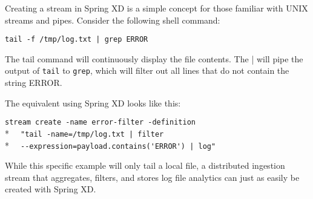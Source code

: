 Creating a stream in Spring XD is a simple concept for those familiar with
UNIX streams and pipes. Consider the following shell command:

\verb;tail -f /tmp/log.txt | grep ERROR;

The tail command will continuously display the file contents. The |
will pipe the output of \texttt{tail} to \texttt{grep}, which will filter 
out all lines that do not contain the string ERROR.

The equivalent using Spring XD looks like this:

\verb;stream create -name error-filter -definition;\\*
\verb;  "tail -name=/tmp/log.txt | filter;\\*
\verb;  --expression=payload.contains('ERROR') | log";

While this specific example will only tail a local file, a distributed 
ingestion stream that aggregates, filters, and stores log file analytics
can just as easily be created with Spring XD.
